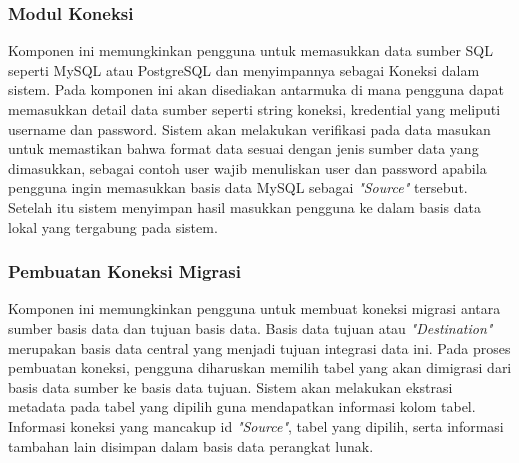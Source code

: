   \subsubsection{Modul Koneksi}
  Komponen ini memungkinkan pengguna untuk memasukkan data sumber SQL seperti MySQL atau PostgreSQL dan menyimpannya sebagai Koneksi dalam sistem. Pada komponen ini akan disediakan antarmuka di mana pengguna dapat memasukkan detail data sumber seperti string koneksi, kredential yang meliputi username dan password. Sistem akan melakukan verifikasi pada data masukan untuk memastikan bahwa format data sesuai dengan jenis sumber data yang dimasukkan, sebagai contoh user wajib menuliskan user dan password apabila pengguna ingin memasukkan basis data MySQL sebagai \emph{"Source"} tersebut. Setelah itu sistem menyimpan hasil masukkan pengguna ke dalam basis data lokal yang tergabung pada sistem.

  \subsubsection{Pembuatan Koneksi Migrasi}
  Komponen ini memungkinkan pengguna untuk membuat koneksi migrasi antara sumber basis data dan tujuan basis data. Basis data tujuan atau \emph{"Destination"} merupakan basis data central yang menjadi tujuan integrasi data ini. Pada proses pembuatan koneksi, pengguna diharuskan memilih tabel yang akan dimigrasi dari basis data sumber ke basis data tujuan. Sistem akan melakukan ekstrasi metadata pada tabel yang dipilih guna mendapatkan informasi kolom tabel. Informasi koneksi yang mancakup id \emph{"Source"}, tabel yang dipilih, serta informasi tambahan lain disimpan dalam basis data perangkat lunak.

